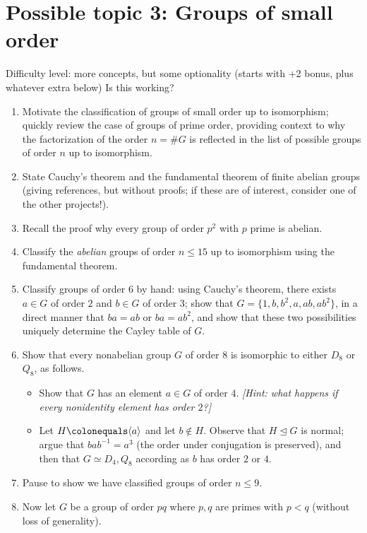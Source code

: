 \section*{Possible topic 3: Groups of small order}
Difficulty level: more concepts, but some optionality (starts with +2 bonus, plus 
whatever extra below) Is this working?

\begin{enumerate}[label=\arabic{enumi}.]
\item Motivate the classification of groups of small order up to isomorphism; 
quickly review the case of groups of prime order, providing context to why the 
factorization of the order $n=\#G$ is reflected in the list of possible groups of 
order $n$ up to isomorphism.  
\item State Cauchy's theorem and the fundamental theorem of finite abelian groups 
(giving references, but without proofs; if these are of interest, consider one of 
the other projects!).  
\item Recall the proof why every group of order $p^2$ with $p$ prime is abelian.  
\item Classify the \emph{abelian} groups of order $n \leq 15$ up to isomorphism 
using the fundamental theorem.
\item Classify groups of order $6$ by hand: using Cauchy's theorem, there exists $a
\in G$ of order $2$ and $b \in G$ of order $3$;
  show that $G=\{1,b,b^2,a,ab,ab^2\}$, in a direct manner that
  $ba=ab$ or $ba=ab^2$, and show that these two possibilities uniquely determine
  the Cayley table of $G$.
\item Show that every nonabelian group $G$ of order $8$ is isomorphic to either 
$D_8$ or $Q_8$, as follows.
\begin{itemize}
\item Show that $G$ has an element $a \in G$ of order $4$.  \emph{[Hint: what 
happens if every nonidentity element has order $2$?]}
\item Let $H \colonequals \langle a \rangle$ and let $b \not \in H$.  Observe that 
$H \trianglelefteq G$ is normal; argue that $bab^{-1}=a^3$ (the order under 
conjugation is preserved), and then that $G \simeq D_4,Q_8$ according as $b$ has 
order $2$ or $4$.  
\end{itemize}
\item Pause to show we have classified groups of order $n \leq 9$.  
\item Now let $G$ be a group of order $pq$ where $p,q$ are primes with $p < q$ 
(without loss of generality).  

\end{enumerate}
